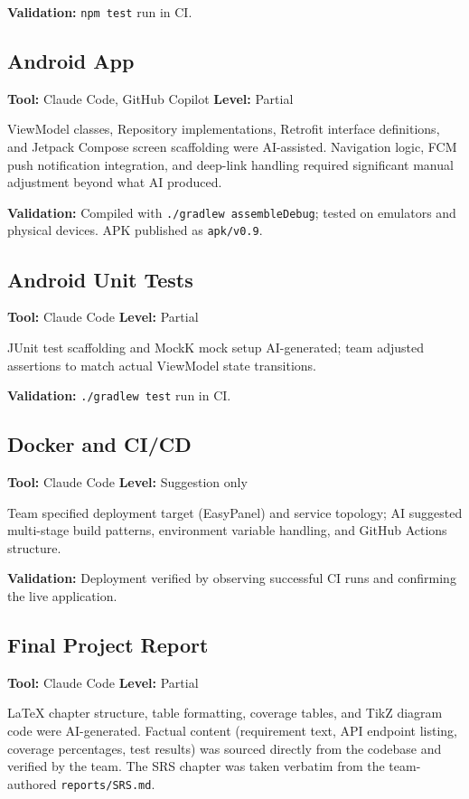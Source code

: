 \documentclass[11pt,a4paper]{report}
\begin{document}
\textbf{Validation:} \texttt{npm test} run in CI.

\subsection{Android App}

\textbf{Tool:} Claude Code, GitHub Copilot \quad \textbf{Level:} Partial

ViewModel classes, Repository implementations, Retrofit interface definitions, and Jetpack Compose screen scaffolding were AI-assisted. Navigation logic, FCM push notification integration, and deep-link handling required significant manual adjustment beyond what AI produced.

\textbf{Validation:} Compiled with \texttt{./gradlew assembleDebug}; tested on emulators and physical devices. APK published as \texttt{apk/v0.9}.

\subsection{Android Unit Tests}

\textbf{Tool:} Claude Code \quad \textbf{Level:} Partial

JUnit test scaffolding and MockK mock setup AI-generated; team adjusted assertions to match actual ViewModel state transitions.

\textbf{Validation:} \texttt{./gradlew test} run in CI.

\subsection{Docker and CI/CD}

\textbf{Tool:} Claude Code \quad \textbf{Level:} Suggestion only

Team specified deployment target (EasyPanel) and service topology; AI suggested multi-stage build patterns, environment variable handling, and GitHub Actions structure.

\textbf{Validation:} Deployment verified by observing successful CI runs and confirming the live application.

\subsection{Final Project Report}

\textbf{Tool:} Claude Code \quad \textbf{Level:} Partial

LaTeX chapter structure, table formatting, coverage tables, and TikZ diagram code were AI-generated. Factual content (requirement text, API endpoint listing, coverage percentages, test results) was sourced directly from the codebase and verified by the team. The SRS chapter was taken verbatim from the team-authored \texttt{reports/SRS.md}.
\end{document}
